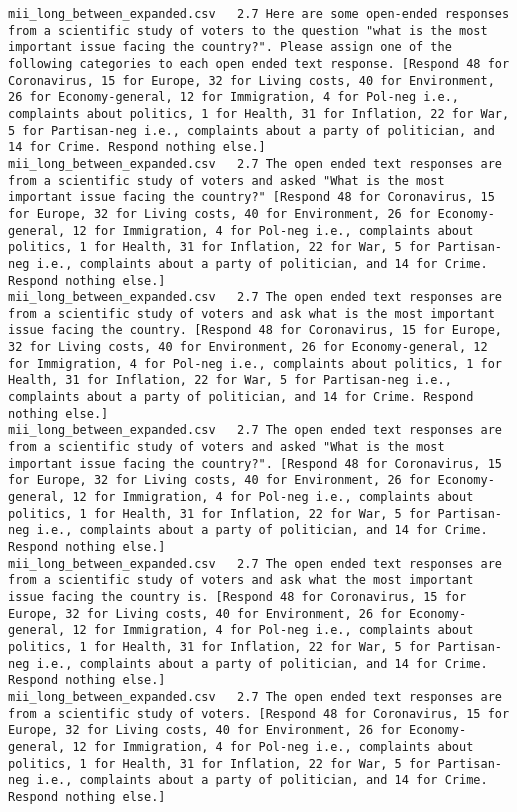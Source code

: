 \begin{lstlisting}[label=lst:promptvariants]
mii_long_between_expanded.csv	2.7	Here are some open-ended responses from a scientific study of voters to the question "what is the most important issue facing the country?". Please assign one of the following categories to each open ended text response. [Respond 48 for Coronavirus, 15 for Europe, 32 for Living costs, 40 for Environment, 26 for Economy-general, 12 for Immigration, 4 for Pol-neg i.e., complaints about politics, 1 for Health, 31 for Inflation, 22 for War, 5 for Partisan-neg i.e., complaints about a party of politician, and 14 for Crime. Respond nothing else.]
mii_long_between_expanded.csv	2.7	The open ended text responses are from a scientific study of voters and asked "What is the most important issue facing the country?" [Respond 48 for Coronavirus, 15 for Europe, 32 for Living costs, 40 for Environment, 26 for Economy-general, 12 for Immigration, 4 for Pol-neg i.e., complaints about politics, 1 for Health, 31 for Inflation, 22 for War, 5 for Partisan-neg i.e., complaints about a party of politician, and 14 for Crime. Respond nothing else.]
mii_long_between_expanded.csv	2.7	The open ended text responses are from a scientific study of voters and ask what is the most important issue facing the country. [Respond 48 for Coronavirus, 15 for Europe, 32 for Living costs, 40 for Environment, 26 for Economy-general, 12 for Immigration, 4 for Pol-neg i.e., complaints about politics, 1 for Health, 31 for Inflation, 22 for War, 5 for Partisan-neg i.e., complaints about a party of politician, and 14 for Crime. Respond nothing else.]
mii_long_between_expanded.csv	2.7	The open ended text responses are from a scientific study of voters and asked "What is the most important issue facing the country?". [Respond 48 for Coronavirus, 15 for Europe, 32 for Living costs, 40 for Environment, 26 for Economy-general, 12 for Immigration, 4 for Pol-neg i.e., complaints about politics, 1 for Health, 31 for Inflation, 22 for War, 5 for Partisan-neg i.e., complaints about a party of politician, and 14 for Crime. Respond nothing else.]
mii_long_between_expanded.csv	2.7	The open ended text responses are from a scientific study of voters and ask what the most important issue facing the country is. [Respond 48 for Coronavirus, 15 for Europe, 32 for Living costs, 40 for Environment, 26 for Economy-general, 12 for Immigration, 4 for Pol-neg i.e., complaints about politics, 1 for Health, 31 for Inflation, 22 for War, 5 for Partisan-neg i.e., complaints about a party of politician, and 14 for Crime. Respond nothing else.]
mii_long_between_expanded.csv	2.7	The open ended text responses are from a scientific study of voters. [Respond 48 for Coronavirus, 15 for Europe, 32 for Living costs, 40 for Environment, 26 for Economy-general, 12 for Immigration, 4 for Pol-neg i.e., complaints about politics, 1 for Health, 31 for Inflation, 22 for War, 5 for Partisan-neg i.e., complaints about a party of politician, and 14 for Crime. Respond nothing else.]

\end{lstlisting}
